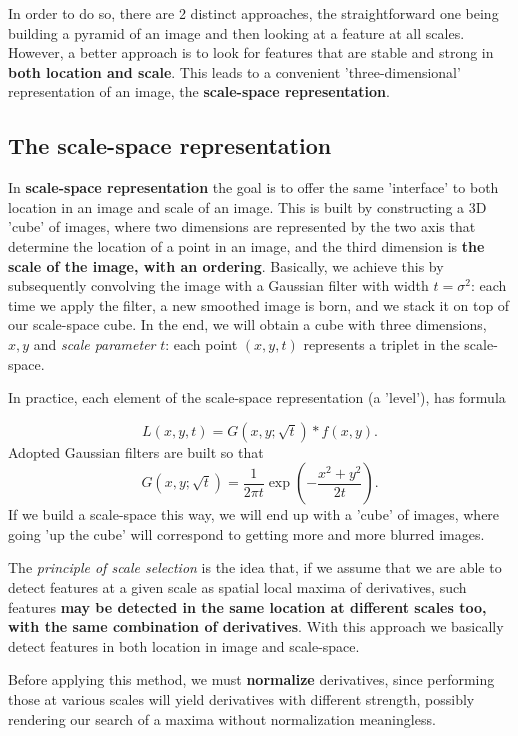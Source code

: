 \documentclass[10pt]{report}
\begin{document}
In order to do so, there are 2 distinct approaches, the straightforward
one being building a pyramid of an image and then looking at a feature
at all scales. However, a better approach is to look for features that
are stable and strong in \textbf{both location and scale}. This leads to a
convenient 'three-dimensional' representation of an image, the
\textbf{scale-space representation}.

\subsection{The scale-space representation}
\label{the-scale-space-representation}
In \textbf{scale-space representation} the goal is to offer the same
'interface' to both location in an image and scale of an image. This is
built by constructing a 3D 'cube' of images, where two dimensions are
represented by the two axis that determine the location of a point in an
image, and the third dimension is \textbf{the scale of the image, with an
ordering}. Basically, we achieve this by subsequently convolving the
image with a Gaussian filter with width \(t = \sigma^2\): each time we
apply the filter, a new smoothed image is born, and we stack it on top
of our scale-space cube. In the end, we will obtain a cube with three
dimensions, \(x, y\) and \emph{scale parameter} \(t\): each point
\((x, y, t)\) represents a triplet in the scale-space.

In practice, each element of the scale-space representation (a 'level'),
has formula

\[L(x, y, t) = G(x, y; \sqrt{t}) * f(x, y).\] Adopted Gaussian filters
are built so that
\[G(x, y; \sqrt{t}) = \frac{1}{2\pi t}\exp{\left(-\frac{x^2 + y^2}{2t}\right)}.\]
If we build a scale-space this way, we will end up with a 'cube' of
images, where going 'up the cube' will correspond to getting more and
more blurred images.

The \emph{principle of scale selection} is the idea that, if we assume that
we are able to detect features at a given scale as spatial local maxima
of derivatives, such features \textbf{may be detected in the same location at
different scales too, with the same combination of derivatives}. With
this approach we basically detect features in both location in image and
scale-space.

Before applying this method, we must \textbf{normalize} derivatives, since
performing those at various scales will yield derivatives with different
strength, possibly rendering our search of a maxima without
normalization meaningless.
\end{document}

